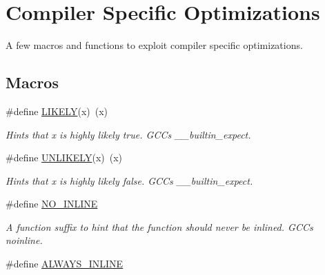 \hypertarget{group__COMPILER}{}\section{Compiler Specific Optimizations}
\label{group__COMPILER}


A few macros and functions to exploit compiler specific optimizations.  


\subsection*{Macros}
\begin{DoxyCompactItemize}
\item 
\#define \hyperlink{group__COMPILER_gaffde14445f49f65ff4f5b592e44ee71a}{L\+I\+K\+E\+LY}(x)~(x)\hypertarget{group__COMPILER_gaffde14445f49f65ff4f5b592e44ee71a}{}\label{group__COMPILER_gaffde14445f49f65ff4f5b592e44ee71a}

\begin{DoxyCompactList}\small\item\em Hints that x is highly likely true. G\+CC\textquotesingle{}s \+\_\+\+\_\+builtin\+\_\+expect. \end{DoxyCompactList}\item 
\#define \hyperlink{group__COMPILER_gab10d0a221f4d7a706701b806c8135fd7}{U\+N\+L\+I\+K\+E\+LY}(x)~(x)\hypertarget{group__COMPILER_gab10d0a221f4d7a706701b806c8135fd7}{}\label{group__COMPILER_gab10d0a221f4d7a706701b806c8135fd7}

\begin{DoxyCompactList}\small\item\em Hints that x is highly likely false. G\+CC\textquotesingle{}s \+\_\+\+\_\+builtin\+\_\+expect. \end{DoxyCompactList}\item 
\#define \hyperlink{group__COMPILER_gab5ce7bd7fe4169a9f709815f03f9870b}{N\+O\+\_\+\+I\+N\+L\+I\+NE}\hypertarget{group__COMPILER_gab5ce7bd7fe4169a9f709815f03f9870b}{}\label{group__COMPILER_gab5ce7bd7fe4169a9f709815f03f9870b}

\begin{DoxyCompactList}\small\item\em A function suffix to hint that the function should never be inlined. G\+CC\textquotesingle{}s noinline. \end{DoxyCompactList}\item 
\#define \hyperlink{group__COMPILER_gaa1dec568e79152c892dcf63f445cbd7a}{A\+L\+W\+A\+Y\+S\+\_\+\+I\+N\+L\+I\+NE}\hypertarget{group__COMPILER_gaa1dec568e79152c892dcf63f445cbd7a}{}\label{group__COMPILER_gaa1dec568e79152c892dcf63f445cbd7a}


\end{DoxyCompactItemize}
